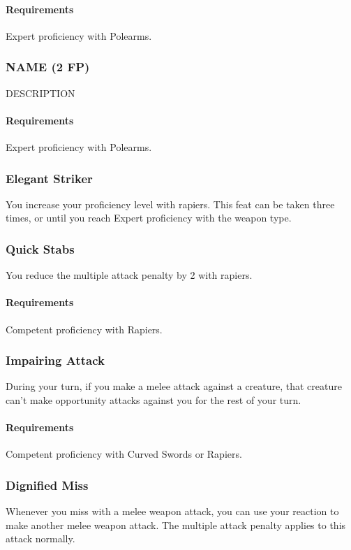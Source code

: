    \paragraph{Requirements} Expert proficiency with Polearms.
\subsubsection{NAME (2 FP)} \label{feat::name}
    DESCRIPTION
    \paragraph{Requirements} Expert proficiency with Polearms.
\subsubsection{Elegant Striker} \label{feat::elegantstriker}
    You increase your proficiency level with rapiers.
    This feat can be taken three times, or until you reach Expert proficiency with the weapon type.
\subsubsection{Quick Stabs} \label{feat::quickstabs}
    You reduce the multiple attack penalty by 2 with rapiers.
    \paragraph{Requirements} Competent proficiency with Rapiers.
\subsubsection{Impairing Attack} \label{feat::impairingattack}
    During your turn, if you make a melee attack against a creature, that creature can't make opportunity attacks against you for the rest of your turn.
    \paragraph{Requirements} Competent proficiency with Curved Swords or Rapiers.
\subsubsection{Dignified Miss} \label{feat::dignifiedmiss}
    Whenever you miss with a melee weapon attack, you can use your reaction to make another melee weapon attack.
    The multiple attack penalty applies to this attack normally.
